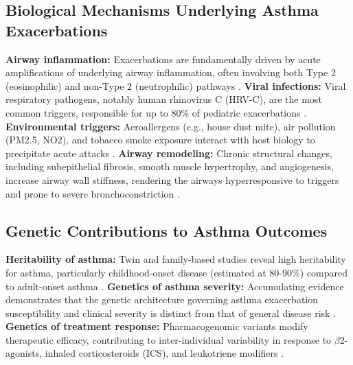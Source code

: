 \documentclass[11pt,a4paper]{article}
\begin{document}
\subsection{Biological Mechanisms Underlying Asthma Exacerbations}
\textbf{Airway inflammation:} Exacerbations are fundamentally driven by acute amplifications of underlying airway inflammation, often involving both Type 2 (eosinophilic) and non-Type 2 (neutrophilic) pathways \cite{Thomson2022}.
\textbf{Viral infections:} Viral respiratory pathogens, notably human rhinovirus C (HRV-C), are the most common triggers, responsible for up to 80\% of pediatric exacerbations \cite{McGeachieWu2015, PalmoCantarelli2021}.
\textbf{Environmental triggers:} Aeroallergens (e.g., house dust mite), air pollution (PM2.5, NO2), and tobacco smoke exposure interact with host biology to precipitate acute attacks \cite{KelchtermansMarch2024, BaekJung2022}.
\textbf{Airway remodeling:} Chronic structural changes, including subepithelial fibrosis, smooth muscle hypertrophy, and angiogenesis, increase airway wall stiffness, rendering the airways hyperresponsive to triggers and prone to severe bronchoconstriction \cite{HurBroide2019, OjiakuCao2018}.

\subsection{Genetic Contributions to Asthma Outcomes}
\textbf{Heritability of asthma:} Twin and family-based studies reveal high heritability for asthma, particularly childhood-onset disease (estimated at 80-90\%) compared to adult-onset asthma \cite{PividoriSchoettler2018, DharmagePerret2019}.
\textbf{Genetics of asthma severity:} Accumulating evidence demonstrates that the genetic architecture governing asthma exacerbation susceptibility and clinical severity is distinct from that of general disease risk \cite{ParkTantisira2017, HerreraLuisEspuelaOrtiz2020}.
\textbf{Genetics of treatment response:} Pharmacogenomic variants modify therapeutic efficacy, contributing to inter-individual variability in response to $\beta2$-agonists, inhaled corticosteroids (ICS), and leukotriene modifiers \cite{EdrisRoos2021, HernandezPachecoPinoYanes2019}.
\end{document}
